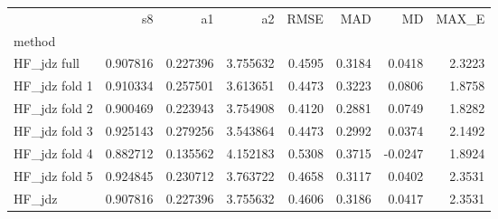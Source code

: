\begin{tabular}{lrrrrrrr}
 & s8 & a1 & a2 & RMSE & MAD & MD & MAX_E \\
method &  &  &  &  &  &  &  \\
HF_jdz full & 0.907816 & 0.227396 & 3.755632 & 0.4595 & 0.3184 & 0.0418 & 2.3223 \\
HF_jdz fold 1 & 0.910334 & 0.257501 & 3.613651 & 0.4473 & 0.3223 & 0.0806 & 1.8758 \\
HF_jdz fold 2 & 0.900469 & 0.223943 & 3.754908 & 0.4120 & 0.2881 & 0.0749 & 1.8282 \\
HF_jdz fold 3 & 0.925143 & 0.279256 & 3.543864 & 0.4473 & 0.2992 & 0.0374 & 2.1492 \\
HF_jdz fold 4 & 0.882712 & 0.135562 & 4.152183 & 0.5308 & 0.3715 & -0.0247 & 1.8924 \\
HF_jdz fold 5 & 0.924845 & 0.230712 & 3.763722 & 0.4658 & 0.3117 & 0.0402 & 2.3531 \\
HF_jdz & 0.907816 & 0.227396 & 3.755632 & 0.4606 & 0.3186 & 0.0417 & 2.3531 \\
\end{tabular}
